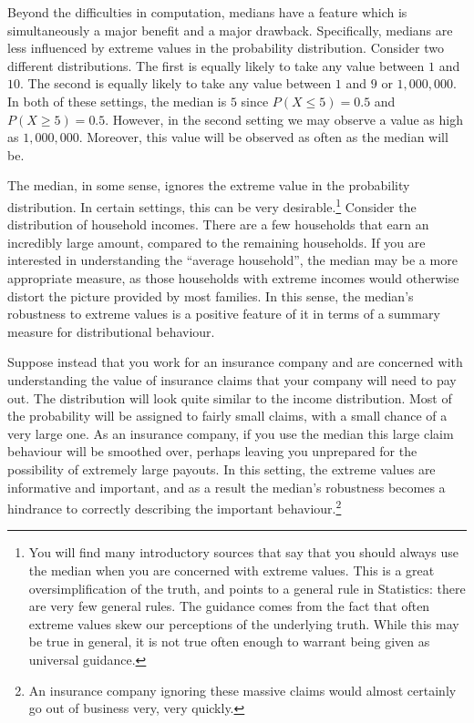 \documentclass[
  letterpaper,
  DIV=11,
  numbers=noendperiod]{scrreprt}
\theoremstyle{definition}
\theoremstyle{definition}
\theoremstyle{definition}
\theoremstyle{remark}
\begin{document}
Beyond the difficulties in computation, medians have a feature which is
simultaneously a major benefit and a major drawback. Specifically,
medians are less influenced by extreme values in the probability
distribution. Consider two different distributions. The first is equally
likely to take any value between \(1\) and \(10\). The second is equally
likely to take any value between \(1\) and \(9\) or \(1,000,000\). In
both of these settings, the median is \(5\) since \(P(X\leq 5) = 0.5\)
and \(P(X \geq 5) = 0.5\). However, in the second setting we may observe
a value as high as \(1,000,000\). Moreover, this value will be observed
as often as the median will be.

The median, in some sense, ignores the extreme value in the probability
distribution. In certain settings, this can be very
desirable.\footnote{You will find many introductory sources that say
  that you should always use the median when you are concerned with
  extreme values. This is a great oversimplification of the truth, and
  points to a general rule in Statistics: there are very few general
  rules. The guidance comes from the fact that often extreme values skew
  our perceptions of the underlying truth. While this may be true in
  general, it is not true often enough to warrant being given as
  universal guidance.} Consider the distribution of household incomes.
There are a few households that earn an incredibly large amount,
compared to the remaining households. If you are interested in
understanding the ``average household'', the median may be a more
appropriate measure, as those households with extreme incomes would
otherwise distort the picture provided by most families. In this sense,
the median's robustness to extreme values is a positive feature of it in
terms of a summary measure for distributional behaviour.

Suppose instead that you work for an insurance company and are concerned
with understanding the value of insurance claims that your company will
need to pay out. The distribution will look quite similar to the income
distribution. Most of the probability will be assigned to fairly small
claims, with a small chance of a very large one. As an insurance
company, if you use the median this large claim behaviour will be
smoothed over, perhaps leaving you unprepared for the possibility of
extremely large payouts. In this setting, the extreme values are
informative and important, and as a result the median's robustness
becomes a hindrance to correctly describing the important
behaviour.\footnote{An insurance company ignoring these massive claims
  would almost certainly go out of business very, very quickly.}
\end{document}
